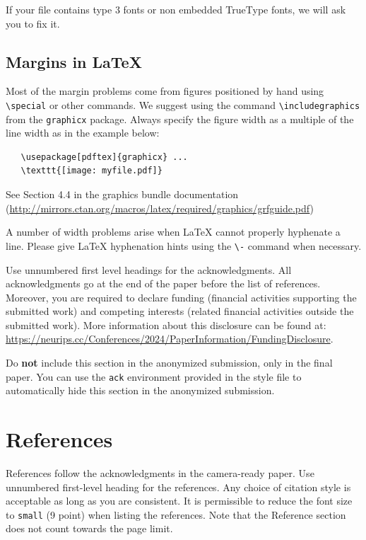 \documentclass{article}
\begin{document}
If your file contains type 3 fonts or non embedded TrueType fonts, we will ask
you to fix it.


\subsection{Margins in \LaTeX{}}


Most of the margin problems come from figures positioned by hand using
\verb+\special+ or other commands. We suggest using the command
\verb+\includegraphics+ from the \verb+graphicx+ package. Always specify the
figure width as a multiple of the line width as in the example below:
\begin{verbatim}
   \usepackage[pdftex]{graphicx} ...
   \texttt{[image: myfile.pdf]}
\end{verbatim}
See Section 4.4 in the graphics bundle documentation
(\url{http://mirrors.ctan.org/macros/latex/required/graphics/grfguide.pdf})


A number of width problems arise when \LaTeX{} cannot properly hyphenate a
line. Please give LaTeX hyphenation hints using the \verb+\-+ command when
necessary.

\begin{ack}
Use unnumbered first level headings for the acknowledgments. All acknowledgments
go at the end of the paper before the list of references. Moreover, you are required to declare
funding (financial activities supporting the submitted work) and competing interests (related financial activities outside the submitted work).
More information about this disclosure can be found at: \url{https://neurips.cc/Conferences/2024/PaperInformation/FundingDisclosure}.


Do {\bf not} include this section in the anonymized submission, only in the final paper. You can use the \texttt{ack} environment provided in the style file to automatically hide this section in the anonymized submission.
\end{ack}

\section*{References}


References follow the acknowledgments in the camera-ready paper. Use unnumbered first-level heading for
the references. Any choice of citation style is acceptable as long as you are
consistent. It is permissible to reduce the font size to \verb+small+ (9 point)
when listing the references.
Note that the Reference section does not count towards the page limit.
\medskip
\end{document}
